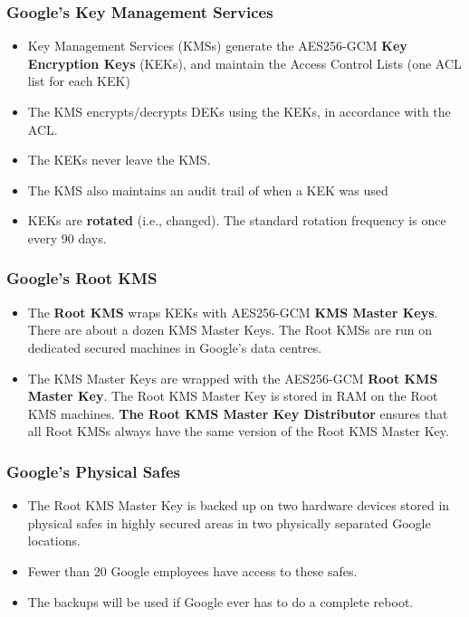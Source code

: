 \documentclass[12pt,titlepage]{article}
\begin{document}
\subsubsection{Google's Key Management Services}
\begin{itemize}
	\item Key Management Services (KMSs) generate the AES256-GCM \textbf{Key Encryption Keys} (KEKs), and maintain the Access Control Lists (one ACL list for each KEK)
	\item The KMS encrypts/decrypts DEKs using the KEKs, in accordance with the ACL.
	\item The KEKs never leave the KMS.
	\item The KMS also maintains an audit trail of when a KEK was used
	\item KEKs are \textbf{rotated} (i.e., changed). The standard rotation frequency is once every 90 days.
\end{itemize}

\subsubsection{Google's Root KMS}
\begin{itemize}
	\item The \textbf{Root KMS} wraps KEKs with AES256-GCM \textbf{KMS Master Keys}. There are about a dozen KMS Master Keys. The Root KMSs are run on dedicated secured machines in Google’s data centres.
	\item The KMS Master Keys are wrapped with the AES256-GCM \textbf{Root KMS Master Key}. The Root KMS Master Key is stored in RAM on the Root KMS machines. \textbf{The Root KMS Master Key Distributor} ensures that all Root KMSs always have the same version of the Root KMS Master Key.
\end{itemize}

\subsubsection{Google's Physical Safes}
\begin{itemize}
	\item The Root KMS Master Key is backed up on two hardware devices stored in physical safes in highly secured areas in two physically separated Google locations.
	\item Fewer than 20 Google employees have access to these safes.
	\item The backups will be used if Google ever has to do a complete reboot.
\end{itemize}
\end{document}
